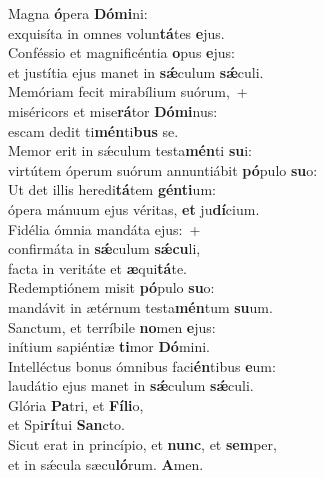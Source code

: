 \evenverse Magna \textbf{ó}pera \textbf{Dó}\textbf{mi}ni:~\*\\
\evenverse exquisíta in omnes volun\textbf{tá}tes \textbf{e}jus.\\
\oddverse Conféssio et magnificéntia \textbf{o}pus \textbf{e}jus:~\*\\
\oddverse et justítia ejus manet in \textbf{sǽ}culum \textbf{sǽ}culi.\\
\evenverse Memóriam fecit mirabílium suórum,~+\\
\evenverse  miséricors et mise\textbf{rá}tor \textbf{Dó}\textbf{mi}nus:~\*\\
\evenverse escam dedit ti\textbf{mén}ti\textbf{bus} se.\\
\oddverse Memor erit in sǽculum testa\textbf{mén}ti \textbf{su}i:~\*\\
\oddverse virtútem óperum suórum annuntiábit \textbf{pó}pulo \textbf{su}o:\\
\evenverse Ut det illis heredi\textbf{tá}tem \textbf{gén}\textbf{ti}um:~\*\\
\evenverse ópera mánuum ejus véritas, \textbf{et} ju\textbf{dí}cium.\\
\oddverse Fidélia ómnia mandáta ejus:~+\\
\oddverse  confirmáta in \textbf{sǽ}culum \textbf{sǽ}\textbf{cu}li,~\*\\
\oddverse facta in veritáte et \textbf{æ}qui\textbf{tá}te.\\
\evenverse Redemptiónem misit \textbf{pó}pulo \textbf{su}o:~\*\\
\evenverse mandávit in ætérnum testa\textbf{mén}tum \textbf{su}um.\\
\oddverse Sanctum, et terríbile \textbf{no}men \textbf{e}jus:~\*\\
\oddverse inítium sapiéntiæ \textbf{ti}mor \textbf{Dó}mini.\\
\evenverse Intelléctus bonus ómnibus faci\textbf{én}tibus \textbf{e}um:~\*\\
\evenverse laudátio ejus manet in \textbf{sǽ}culum \textbf{sǽ}culi.\\
\oddverse Glória \textbf{Pa}tri, et \textbf{Fí}\textbf{li}o,~\*\\
\oddverse et Spi\textbf{rí}tui \textbf{San}cto.\\
\evenverse Sicut erat in princípio, et \textbf{nunc}, et \textbf{sem}per,~\*\\
\evenverse et in sǽcula sæcu\textbf{ló}rum. \textbf{A}men.\\
